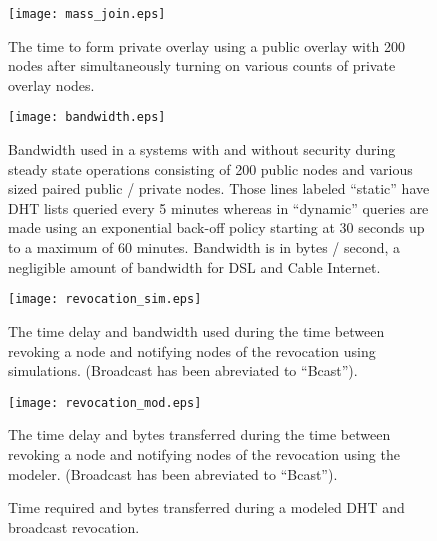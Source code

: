 \begin{figure}[ht]
\centering
\texttt{[image: mass\_join.eps]}
\caption[Large simultaneous private pool joins.]{The time to form private
overlay using a public overlay with 200 nodes after simultaneously turning on
various counts of private overlay nodes.}
\label{fig:big_join}
\end{figure}

\begin{figure}[ht]
\centering
\texttt{[image: bandwidth.eps]}
\caption[Bandwidth comparison of insecure and secure overlays.]{Bandwidth used
in a systems with and without security during steady state operations
consisting of 200 public nodes and various sized paired public / private nodes.
Those lines labeled ``static'' have DHT lists queried every 5 minutes whereas
in ``dynamic'' queries are made using an exponential back-off policy starting
at 30 seconds up to a maximum of 60 minutes.  Bandwidth is in bytes / second, a
negligible amount of bandwidth for DSL and Cable Internet.}
\label{fig:pvo_bandwidth}
\end{figure}

\begin{figure}[ht]
\centering
\texttt{[image: revocation\_sim.eps]}
\caption[Simulated broadcast revocation evaluation.]{The time delay and
bandwidth used during the time between revoking a node and notifying nodes of
the revocation using simulations.  (Broadcast has been abreviated to
``Bcast'').}
\label{fig:revocation_sim}
\end{figure}

\begin{figure}[ht]
\centering
\texttt{[image: revocation\_mod.eps]}
\caption[Modeled broadcast revocation evaluation.]{The time delay and bytes
transferred during the time between revoking a node and notifying nodes of the
revocation using the modeler.  (Broadcast has been abreviated to ``Bcast'').}
\caption{Time required and bytes transferred during a modeled DHT and broadcast
revocation.}
\label{fig:revocation_mod}
\end{figure}

